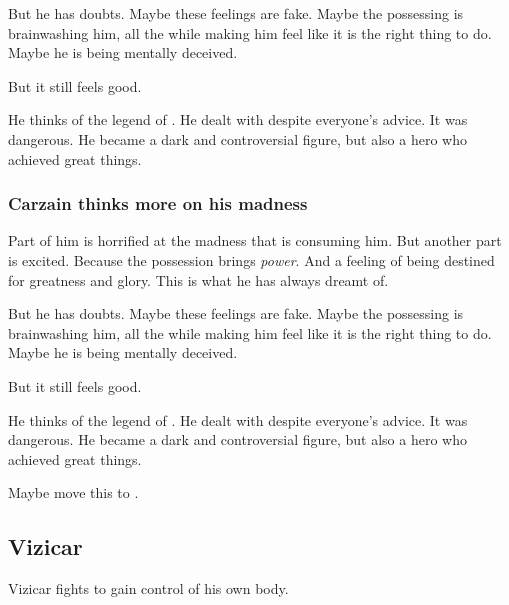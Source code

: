But he has doubts. 
Maybe these feelings are fake. 
Maybe the possessing \Archon{} is brainwashing him, all the while making him feel like it is the right thing to do. 
Maybe he is being mentally deceived. 

But it still feels good. 

He thinks of the legend of . 
He dealt with \qliphoth{} despite everyone's advice. 
It was dangerous. 
He became a dark and controversial figure, but also a hero who achieved great things. 





\subsubsection{Carzain thinks more on his madness}
Part of him is horrified at the madness that is consuming him. 
But another part is excited. 
Because the possession brings \emph{power}. 
And a feeling of being destined for greatness and glory. 
This is what he has always dreamt of. 

But he has doubts. 
Maybe these feelings are fake. 
Maybe the possessing \Archon{} is brainwashing him, all the while making him feel like it is the right thing to do. 
Maybe he is being mentally deceived. 

But it still feels good. 

He thinks of the legend of . 
He dealt with \qliphoth{} despite everyone's advice. 
It was dangerous. 
He became a dark and controversial figure, but also a hero who achieved great things. 

Maybe move this to . 





\subsection{Vizicar}
Vizicar fights to gain control of his own body. 


